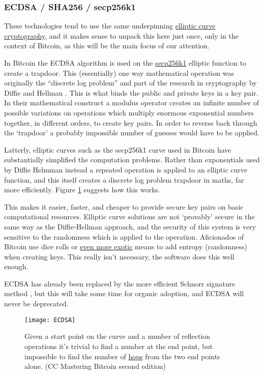 \subsubsection{ECDSA / SHA256 / secp256k1}
These technologies tend to use the same underpinning \href{https://curves.ulfheim.net/}{elliptic curve cryptography}, and it makes sense to unpack this here just once, only in the context of Bitcoin, as this will be the main focus of our attention.\par
In Bitcoin the ECDSA algorithm is used on the \href{https://en.bitcoin.it/wiki/Secp256k1}{secp256k1} elliptic function to create a trapdoor. This (essentially) one way mathematical operation was originally the ``discrete log problem'' and part of the research in cryptography by Diffie and Hellman \cite{diffie1976new}. This is what binds the public and private keys in a key pair. In their mathematical construct a modulus operator creates an infinite number of possible variations on operations which multiply enormous exponential numbers together, in different orders, to create key pairs. In order to reverse back through the `trapdoor' a probably impossible number of guesses would have to be applied.\par
Latterly, elliptic curves such as the secp256k1 curve used in Bitcoin have substantially simplified the computation problems. Rather than exponentials used by Diffie Helmman instead a repeated operation is applied to an elliptic curve function, and this itself creates a discrete log problem trapdoor in maths, far more efficiently. Figure \ref{fig:ECDSA} suggests how this works. \par
This makes it easier, faster, and cheaper to provide secure key pairs on basic computational resources. Elliptic curve solutions are not `provably' secure in the same way as the Diffie-Hellman approach, and the security of this system is very sensitive to the randomness which is applied to the operation. Aficionados of Bitcoin use dice rolls or \href{https://www.hackster.io/news/alex-waltz-s-quantum-random-number-generator-for-bitcoin-uses-radioactive-decay-and-a-raspberry-pi-25a75316220f}{even more exotic} means to add entropy (randomness) when creating keys. This really isn't necessary, the software does this well enough.\par  
ECDSA has already been replaced by the more efficient Schnorr signature method \cite{schnorr1989efficient}, but this will take some time for organic adoption, and ECDSA will never be deprecated.\par
\begin{figure}
  \centering
    \texttt{[image: ECDSA]}
  \caption{Given a start point on the curve and a number of reflection operations it's trivial to find a number at the end point, but impossible to find the number of \href{https://github.com/bitcoinbook/bitcoinbook/blob/develop/ch04.asciidoc}{hops} from the two end points alone. (CC Mastering Bitcoin second edition)}
  \label{fig:ECDSA}
\end{figure}

